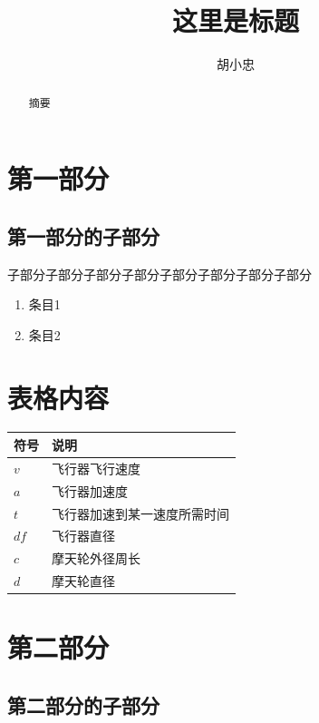 \documentclass[UTF8,12pt]{ctexart}
\title{\bfseries{这里是标题}}
\author{胡小忠}
\begin{document}
\maketitle

\begin{abstract}
    摘要
\end{abstract}
\thispagestyle{empty}
\newpage
\setcounter{page}{1}
\section{第一部分}
\subsection{第一部分的子部分}
子部分子部分子部分子部分子部分子部分子部分子部分
\begin{enumerate}
    \item 条目1
    \item 条目2
\end{enumerate}
\section{表格内容}
    \begin{table}[h]
        \vspace{20pt}
        \centering
        \begin{tabular}{p{2cm}p{6cm}}
            \hline
            符号    &   说明 \\
            \hline       
            $v$     &   飞行器飞行速度 \\
            $a$     &   飞行器加速度 \\
            $t$     &   飞行器加速到某一速度所需时间 \\
            $df$    &   飞行器直径 \\
            $c$     &   摩天轮外径周长 \\
            $d$     &   摩天轮直径 \\
            \hline
        \end{tabular}
    \end{table}
\section{第二部分}
\subsection{第二部分的子部分}
\end{document}
